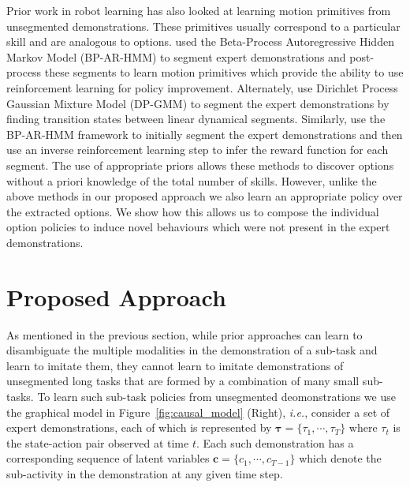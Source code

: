 \documentclass{article} %
\begin{document}

Prior work in robot learning has also looked at learning motion primitives from unsegmented demonstrations. These primitives usually correspond to a particular skill and are analogous to options.
\cite{niekum2011clustering} used the Beta-Process Autoregressive Hidden Markov Model (BP-AR-HMM) to segment expert demonstrations and post-process these segments to learn motion primitives which provide the ability to use reinforcement learning for policy improvement.
Alternately, \cite{krishnan2018transition} use Dirichlet Process Gaussian Mixture Model (DP-GMM) to segment the expert demonstrations by finding transition states between linear dynamical segments.
Similarly, \cite{ranchod2015nonparametric} use the BP-AR-HMM framework to initially segment the expert demonstrations and then use an inverse reinforcement learning step to infer the reward function for each segment.
The use of appropriate priors allows these methods to discover options without a priori knowledge of the total number of skills.
However, unlike the above methods in our proposed approach we also learn an appropriate policy over the extracted options. We show how this allows us to compose the individual option policies to induce novel behaviours which were not present in the expert demonstrations. 

\section{Proposed Approach}
\label{sec:proposed_approach}


As mentioned in the previous section, while prior approaches can learn to disambiguate the multiple modalities in the demonstration of a sub-task and learn to imitate them, they cannot learn to imitate demonstrations of unsegmented long tasks that are formed by a combination of many small sub-tasks. To learn such sub-task policies from unsegmented deomonstrations we use the graphical model in Figure~\ref{fig:causal_model} (Right), \emph{i.e.}, consider a set of expert demonstrations, each of which is represented by $\boldsymbol{\tau} = \{\tau_1, \cdots, \tau_T\}$ where $\tau_t$ is the state-action pair observed at time $t$. Each such demonstration has a corresponding sequence of latent variables $\boldsymbol{c} = \{c_1, \cdots, c_{T-1}\} $ which denote the sub-activity in the demonstration at any given time step. 
\end{document}
